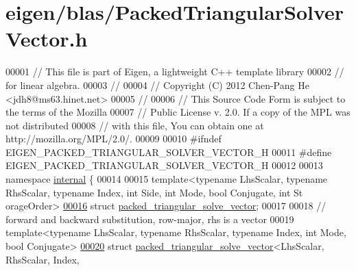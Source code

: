 \hypertarget{eigen_2blas_2_packed_triangular_solver_vector_8h_source}{}\section{eigen/blas/\+Packed\+Triangular\+Solver\+Vector.h}
\label{eigen_2blas_2_packed_triangular_solver_vector_8h_source}

\begin{DoxyCode}
00001 \textcolor{comment}{// This file is part of Eigen, a lightweight C++ template library}
00002 \textcolor{comment}{// for linear algebra.}
00003 \textcolor{comment}{//}
00004 \textcolor{comment}{// Copyright (C) 2012 Chen-Pang He <jdh8@ms63.hinet.net>}
00005 \textcolor{comment}{//}
00006 \textcolor{comment}{// This Source Code Form is subject to the terms of the Mozilla}
00007 \textcolor{comment}{// Public License v. 2.0. If a copy of the MPL was not distributed}
00008 \textcolor{comment}{// with this file, You can obtain one at http://mozilla.org/MPL/2.0/.}
00009 
00010 \textcolor{preprocessor}{#ifndef EIGEN\_PACKED\_TRIANGULAR\_SOLVER\_VECTOR\_H}
00011 \textcolor{preprocessor}{#define EIGEN\_PACKED\_TRIANGULAR\_SOLVER\_VECTOR\_H}
00012 
00013 \textcolor{keyword}{namespace }\hyperlink{namespaceinternal}{internal} \{
00014 
00015 \textcolor{keyword}{template}<\textcolor{keyword}{typename} LhsScalar, \textcolor{keyword}{typename} RhsScalar, \textcolor{keyword}{typename} Index, \textcolor{keywordtype}{int} S\textcolor{keywordtype}{id}e, \textcolor{keywordtype}{int} Mode, \textcolor{keywordtype}{bool} Conjugate, \textcolor{keywordtype}{int} St
      orageOrder>
\hyperlink{structinternal_1_1packed__triangular__solve__vector}{00016} \textcolor{keyword}{struct }\hyperlink{structinternal_1_1packed__triangular__solve__vector}{packed\_triangular\_solve\_vector};
00017 
00018 \textcolor{comment}{// forward and backward substitution, row-major, rhs is a vector}
00019 \textcolor{keyword}{template}<\textcolor{keyword}{typename} LhsScalar, \textcolor{keyword}{typename} RhsScalar, \textcolor{keyword}{typename} Index, \textcolor{keywordtype}{int} Mode, \textcolor{keywordtype}{bool} Conjugate>
\hyperlink{structinternal_1_1packed__triangular__solve__vector_3_01_lhs_scalar_00_01_rhs_scalar_00_01_indexc5a73935a3beb9907eb3aa30bec77d7b}{00020} \textcolor{keyword}{struct }\hyperlink{structinternal_1_1packed__triangular__solve__vector}{packed\_triangular\_solve\_vector}<LhsScalar, RhsScalar, Index, 

\end{DoxyCode}
